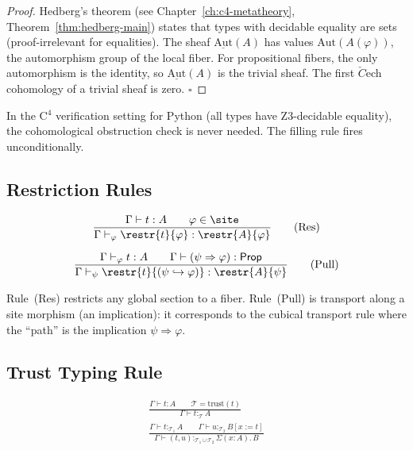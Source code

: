 \begin{proof}
Hedberg's theorem (see Chapter~\ref{ch:c4-metatheory},
Theorem~\ref{thm:hedberg-main}) states that types with decidable equality
are sets (proof-irrelevant for equalities).  The sheaf
\(\underline{\mathrm{Aut}}(A)\) has values \(\mathrm{Aut}(A(\varphi))\),
the automorphism group of the local fiber.  For propositional fibers,
the only automorphism is the identity, so
\(\underline{\mathrm{Aut}}(A)\) is the trivial sheaf.
The first \(\check{C}\)ech cohomology of a trivial sheaf is zero.
\hfill\(\square\)
\end{proof}

\begin{corollary}
In the C\(^4\) verification setting for Python (all types have
Z3-decidable equality), the cohomological obstruction check is never
needed.  The filling rule fires unconditionally.
\end{corollary}

\subsection{Restriction Rules}

\begin{gather}
\frac{\Gamma \vdash t : A \qquad \varphi \in \site}
     {\Gamma \vdash_\varphi \restr{t}{\varphi} :
      \restr{A}{\varphi}}
\tag{Res}
\\[6pt]
\frac{\Gamma \vdash_\varphi t : A \qquad
      \Gamma \vdash (\psi \Rightarrow \varphi) : \mathsf{Prop}}
     {\Gamma \vdash_\psi \restr{t}{(\psi \hookrightarrow \varphi)} :
      \restr{A}{\psi}}
\tag{Pull}
\end{gather}

Rule~(Res) restricts any global section to a fiber.
Rule~(Pull) is transport along a site morphism (an implication):
it corresponds to the cubical transport rule where the ``path'' is
the implication \(\psi \Rightarrow \varphi\).

\subsection{Trust Typing Rule}

\begin{gather}
\frac{\Gamma \vdash t : A \qquad \mathcal{T} = \mathrm{trust}(t)}
     {\Gamma \vdash t :_{\mathcal{T}} A}
\tag{Trust}
\\[6pt]
\frac{\Gamma \vdash t :_{\mathcal{T}_1} A \qquad
      \Gamma \vdash u :_{\mathcal{T}_2} B[x := t]}
     {\Gamma \vdash (t, u) :_{\mathcal{T}_1 \cup \mathcal{T}_2}
      \Sigma(x : A).\, B}
\tag{Trust$\Sigma$}
\end{gather}

